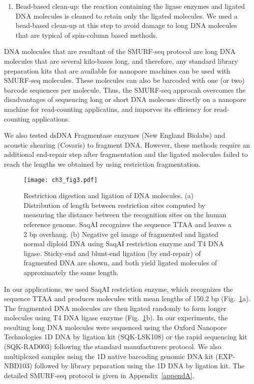 \begin{enumerate}
\item Bead-based clean-up: the reaction containing the ligase enzymes and
  ligated DNA molecules is cleaned to retain only the ligated molecules. We
  used a bead-based clean-up at this step to avoid damage to long DNA
  molecules that are typical of spin-column based methods.
\end{enumerate}

DNA molecules that are resultant of the SMURF-seq protocol are long DNA
molecules that are several kilo-bases long, and therefore, any standard
library preparation kits that are available for nanopore machines can be
used with SMURF-seq molecules. These molecules can also be barcoded
with one (or two) barcode sequences per molecule. Thus, the SMURF-seq
approcah overcomes the disadvantages of sequencing long or short DNA
molecues directly on a nanopore machine for read-counting applicatins, 
and imporves its efficiency for read-counting applications.

We also tested dsDNA Fragmentase enzymes (New England Biolabs) and
acoustic shearing (Covaris) to fragment DNA. However, these methods
require an additional end-repair step after fragmentation and the
ligated molecules failed to reach the lengths we obtained by using
restriction fragmentation.

\begin{figure}[t!]
\centering
\texttt{[image: ch3\_fig3.pdf]}
\caption{Restriction digestion and ligation of DNA molecules.
  (a) Distribution of length between restriction sites computed
  by measuring the distance between the recognition sites on the human
  reference genome. SaqAI recognizes the sequence TTAA and leaves a 2 bp
  overhang.
  (b) Negative gel image of fragmented and ligated normal diploid DNA
  using SaqAI restriction enzyme and T4 DNA ligase.  Sticky-end and
  blunt-end ligation (by end-repair) of fragmented DNA are shown, and
  both yield ligated molecules of approximately the same length.}
\label{re_frag}
\end{figure}

In our applications, we used SaqAI restriction enzyme, which recognizes
the sequence TTAA and produces molecules with mean lengths of 150.2 bp
(Fig.~\ref{re_frag}a).
The fragmented DNA molecules are then ligated randomly to form longer
molecules using T4 DNA ligase enzyme (Fig.~\ref{re_frag}b).
%
In our experiments, the resulting long DNA molecules were sequenced
using the Oxford Nanopore Technologies 1D DNA by ligation kit
(SQK-LSK108) or the rapid sequencing kit (SQK-RAD003) following the
standard manufacturers protocol. We also multiplexed samples using the
1D native barcoding genomic DNA kit (EXP-NBD103) followed by library
prparation using the 1D DNA by ligation kit.
%
The detailed SMURF-seq protocol is given in Appendix~\ref{appendA}.


